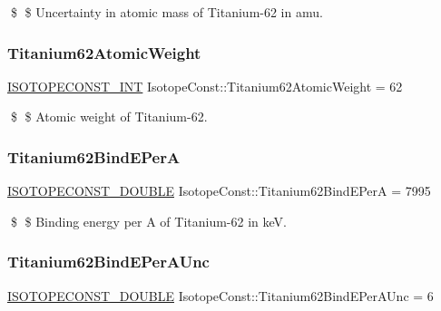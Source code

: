 \$ \$ Uncertainty in atomic mass of Titanium-\/62 in amu. \mbox{\label{group___isotope_const-_titanium-_ti62_ga61ab407a04e367a2e7e30c01c2b365f0}} 
\subsubsection{\texorpdfstring{Titanium62\+Atomic\+Weight}{Titanium62AtomicWeight}}
{\footnotesize\ttfamily \mbox{\hyperlink{group___isotope_const-_macros_ga5f18360b3e99483a35c32d789e62621c}{I\+S\+O\+T\+O\+P\+E\+C\+O\+N\+S\+T\+\_\+\+I\+NT}} Isotope\+Const\+::\+Titanium62\+Atomic\+Weight = 62}

\$ \$ Atomic weight of Titanium-\/62. \mbox{\label{group___isotope_const-_titanium-_ti62_gaf8484d9ebb01eacba42c7729810d470c}} 
\subsubsection{\texorpdfstring{Titanium62\+Bind\+E\+PerA}{Titanium62BindEPerA}}
{\footnotesize\ttfamily \mbox{\hyperlink{group___isotope_const-_macros_ga8f45a7272ce02c0b4c65c44636ed719a}{I\+S\+O\+T\+O\+P\+E\+C\+O\+N\+S\+T\+\_\+\+D\+O\+U\+B\+LE}} Isotope\+Const\+::\+Titanium62\+Bind\+E\+PerA = 7995}

\$ \$ Binding energy per A of Titanium-\/62 in keV. \mbox{\label{group___isotope_const-_titanium-_ti62_ga6fac0cacf99b3ec83dbaba0cbdce8059}} 
\subsubsection{\texorpdfstring{Titanium62\+Bind\+E\+Per\+A\+Unc}{Titanium62BindEPerAUnc}}
{\footnotesize\ttfamily \mbox{\hyperlink{group___isotope_const-_macros_ga8f45a7272ce02c0b4c65c44636ed719a}{I\+S\+O\+T\+O\+P\+E\+C\+O\+N\+S\+T\+\_\+\+D\+O\+U\+B\+LE}} Isotope\+Const\+::\+Titanium62\+Bind\+E\+Per\+A\+Unc = 6}

